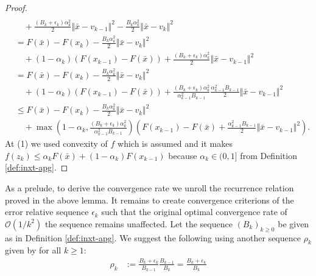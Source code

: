 \documentclass[12pt]{article}
\begin{document}
\begin{proof}
\begin{align*}
                \\ &\quad 
                + \frac{(B_k + \epsilon_k)\alpha_k^2}{2}\Vert \bar x - v_{k - 1} \Vert^2
                - \frac{B_k\alpha_k^2}{2}\Vert \bar x - v_k\Vert^2
            \\
            &= 
            F(\bar x) - F(x_k) 
            - \frac{B_k\alpha_k^2}{2}\Vert \bar x - v_k\Vert^2
                \\ &\quad 
                + (1 - \alpha_k)(F(x_{k - 1}) - F(\bar x))
                + \frac{(B_k + \epsilon_k)\alpha_k^2}{2}\Vert \bar x - v_{k - 1} \Vert^2
            \\
            &= F(\bar x) - F(x_k) 
            - \frac{B_k\alpha_k^2}{2}\Vert \bar x - v_k\Vert^2
                \\ &\quad
                + (1 - \alpha_k)(F(x_{k - 1}) - F(\bar x))
                + \frac{(B_k + \epsilon_k)\alpha_k^2}{\alpha_{k - 1}^2B_{k - 1}}\frac{\alpha_{k - 1}^2B_{k - 1}}{2}\Vert \bar x - v_{k - 1}\Vert^2
            \\
            &\le 
            F(\bar x) - F(x_k) - \frac{B_k\alpha_k^2}{2}\Vert \bar x - v_k\Vert^2
            \\ &\quad 
            + \max\left(
                1 - \alpha_k, 
                \frac{(B_k + \epsilon_k)\alpha_k^2}{\alpha_{k - 1}^2B_{k - 1}}
            \right)
            \left(
                F(x_{k - 1}) - F(\bar x) 
                + \frac{\alpha_{k - 1}^2B_{k - 1}}{2}\Vert \bar x - v_{k - 1} \Vert^2
            \right). 
        \end{align*}
        At (1) we used convexity of $f$ which is assumed and it makes $f(z_k) \le \alpha_k F(\bar x) + (1 - \alpha_k)F(x_{k - 1})$ because $\alpha_k \in (0, 1]$ from Definition \ref{def:inxt-apg}. 
    \end{proof}
    \par
    As a prelude, to derive the convergence rate we unroll the recurrence relation proved in the above lemma.
    It remains to create convergence criterions of the error relative sequence $\epsilon_k$ such that the original optimal convergence rate of $\mathcal O(1/k^2)$ the sequence remains unaffected. 
    Let the sequence $(B_k)_{k \ge 0}$ be given as in Definition \ref{def:inxt-apg}. 
    We suggest the following using another sequence $\rho_k$ given by for all $k \ge 1$: 
    \begin{align*}
        \rho_k &:= \frac{B_k + \epsilon_k}{B_{k - 1}}\frac{B_{k - 1}}{B_k} = \frac{B_k + \epsilon_k}{B_k}
    \end{align*}
\end{document}
